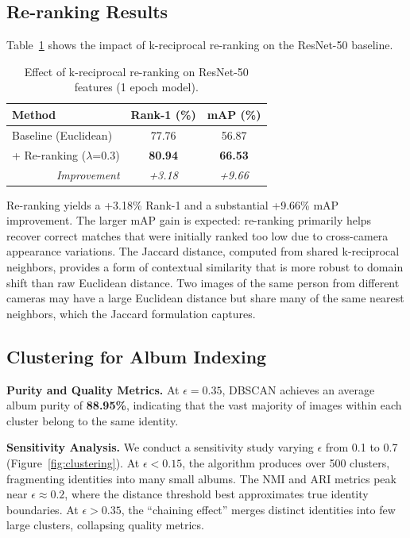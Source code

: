 \documentclass[final]{cvpr}
\begin{document}
\subsection{Re-ranking Results}

Table~\ref{tab:reranking} shows the impact of k-reciprocal re-ranking on the ResNet-50 baseline.

\begin{table}[h]
\centering
\caption{Effect of k-reciprocal re-ranking on ResNet-50 features (1 epoch model).}
\label{tab:reranking}
\begin{tabular}{lcc}
\toprule
\textbf{Method} & \textbf{Rank-1 (\%)} & \textbf{mAP (\%)} \\
\midrule
Baseline (Euclidean)  & 77.76 & 56.87 \\
+ Re-ranking ($\lambda$=0.3) & \textbf{80.94} & \textbf{66.53} \\
\midrule
\multicolumn{1}{r}{\textit{Improvement}} & \textit{+3.18} & \textit{+9.66} \\
\bottomrule
\end{tabular}
\end{table}

Re-ranking yields a +3.18\% Rank-1 and a substantial +9.66\% mAP improvement.
The larger mAP gain is expected: re-ranking primarily helps recover correct matches that were initially ranked too low due to cross-camera appearance variations.
The Jaccard distance, computed from shared k-reciprocal neighbors, provides a form of contextual similarity that is more robust to domain shift than raw Euclidean distance.
Two images of the same person from different cameras may have a large Euclidean distance but share many of the same nearest neighbors, which the Jaccard formulation captures.

\subsection{Clustering for Album Indexing}

\textbf{Purity and Quality Metrics.}
At $\epsilon = 0.35$, DBSCAN achieves an average album purity of \textbf{88.95\%}, indicating that the vast majority of images within each cluster belong to the same identity.

\textbf{Sensitivity Analysis.}
We conduct a sensitivity study varying $\epsilon$ from 0.1 to 0.7 (Figure~\ref{fig:clustering}).
At $\epsilon < 0.15$, the algorithm produces over 500 clusters, fragmenting identities into many small albums.
The NMI and ARI metrics peak near $\epsilon \approx 0.2$, where the distance threshold best approximates true identity boundaries.
At $\epsilon > 0.35$, the ``chaining effect'' merges distinct identities into few large clusters, collapsing quality metrics.
\end{document}
